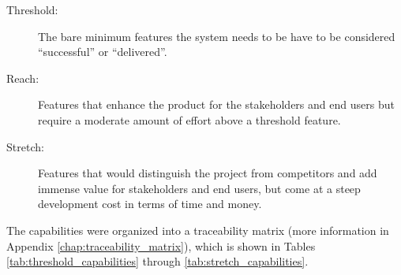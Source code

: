 {
\renewcommand{\descriptionlabel}[1]{\hspace{\labelsep}\textbf{#1}}
\begin{description}
    \item[Threshold:] The bare minimum features the system needs to be have to be considered ``successful'' or ``delivered''.
    
    \item[Reach:] Features that enhance the product for the stakeholders and end users but require a moderate amount of effort above a threshold feature.						
    
    \item[Stretch:] Features that would distinguish the project from competitors and add immense value for stakeholders and end users, but come at a steep development cost in terms of time and money.
\end{description}
}

The capabilities were organized into a traceability matrix (more information in Appendix \ref{chap:traceability_matrix}), which is shown in Tables \ref{tab:threshold_capabilities} through \ref{tab:stretch_capabilities}.

% 



